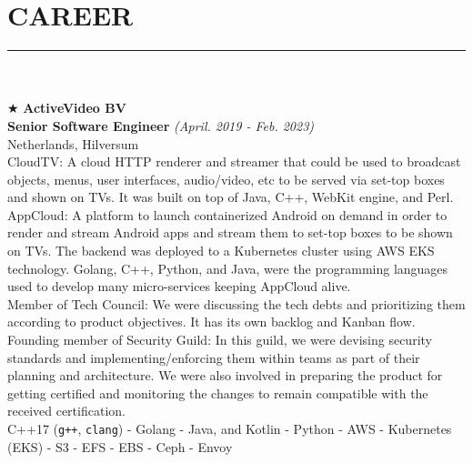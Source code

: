 \documentclass[10pt,a4paper]{article}
\begin{document}
\section{CAREER}
\noindent\rule {18.0cm}{0.2pt} \\ \\
$\bigstar$ \hspace{0.1cm} \large \textbf{ActiveVideo BV} \\
\indent \small \textbf{Senior Software Engineer} \textsl{(April. 2019 - Feb. 2023)} \\
\indent \textnormal{Netherlands, Hilversum} \\
\indent \textbullet \hspace{0.05cm} CloudTV: A cloud HTTP renderer and streamer that could be used to broadcast objects, menus, user interfaces, audio/video, etc to be served via set-top boxes and shown on TVs. It was built on top of Java, C++, WebKit engine, and Perl. \\
\indent \textbullet \hspace{0.05cm} AppCloud: A platform to launch containerized Android on demand in order to render and stream Android apps and stream them to set-top boxes to be shown on TVs. The backend was deployed to a Kubernetes cluster using AWS EKS technology. Golang, C++, Python, and Java, were the programming languages used to develop many micro-services keeping AppCloud alive. \\
\indent \textbullet \hspace{0.05cm} Member of Tech Council: We were discussing the tech debts and prioritizing them according to product objectives. It has its own backlog and Kanban flow. \\
\indent \textbullet \hspace{0.05cm} Founding member of Security Guild: In this guild, we were devising security standards and implementing/enforcing them within teams as part of their planning and architecture. We were also involved in preparing the product for getting certified and monitoring the changes to remain compatible with the received certification. \\
\indent \textbullet \hspace{0.05cm} C++17 (\texttt{g++}, \texttt{clang}) - Golang - Java, and Kotlin - Python - AWS - Kubernetes (EKS) - S3 - EFS - EBS - Ceph - Envoy \\
\end{document}
